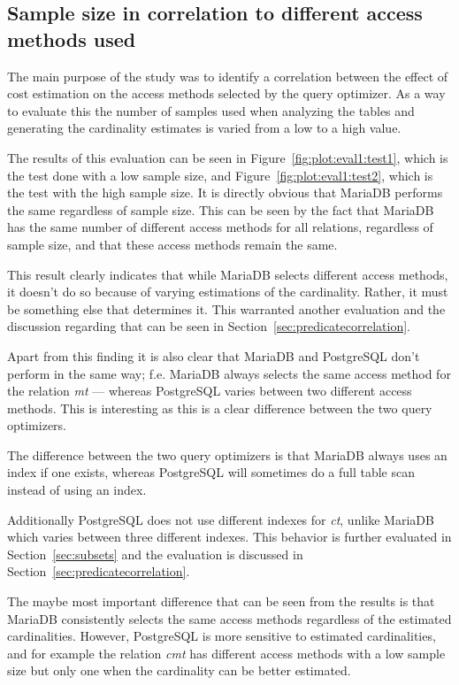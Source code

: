 \subsection{Sample size in correlation to different access methods used}
The main purpose of the study was to identify a correlation between the effect
of cost estimation on the access methods selected by the query optimizer. As a
way to evaluate this the number of samples used when analyzing the tables and
generating the cardinality estimates is varied from a low to a high value.

The results of this evaluation can be seen in Figure~\ref{fig:plot:eval1:test1},
which is the test done with a low sample size, and
Figure~\ref{fig:plot:eval1:test2}, which is the test with the high sample size.
It is directly obvious that MariaDB performs the same regardless of sample size.
This can be seen by the fact that MariaDB has the same number of different
access methods for all relations, regardless of sample size, and that these
access methods remain the same.

This result clearly indicates that while MariaDB selects different access
methods, it doesn't do so because of varying estimations of the cardinality.
Rather, it must be something else that determines it. This warranted another
evaluation and the discussion regarding that can be seen in
Section~\ref{sec:predicatecorrelation}.

Apart from this finding it is also clear that MariaDB and PostgreSQL don't
perform in the same way; f.e. MariaDB always selects the same access method for
the relation \textit{mt} --- whereas PostgreSQL varies between two different access
methods. This is interesting as this is a clear difference between the two query optimizers.

The difference between the two query optimizers is that MariaDB always uses an
index if one exists, whereas PostgreSQL will sometimes do a full table scan
instead of using an index.

Additionally PostgreSQL does not use different indexes for \textit{ct}, unlike
MariaDB which varies between three different indexes. This behavior is further
evaluated in Section~\ref{sec:subsets} and the evaluation is discussed in
Section~\ref{sec:predicatecorrelation}.

The maybe most important difference that can be seen from the results
is that MariaDB consistently selects the same access methods regardless of
the estimated cardinalities. However, PostgreSQL is more sensitive to estimated
cardinalities, and for example the relation \textit{cmt} has different access methods
with a low sample size but only one when the cardinality can be better estimated.

